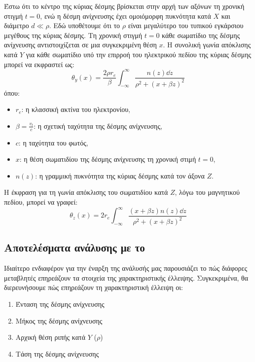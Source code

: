 Έστω ότι το κέντρο της κύριας δέσμης βρίσκεται στην αρχή των αξόνων τη χρονική στιγμή $t = 0$, ενώ η δέσμη ανίχνευσης έχει ομοιόμορφη πυκνότητα κατά $X$ και διάμετρο $d \ll \rho$.
Εδώ υποθέτουμε ότι το $\rho$ είναι μεγαλύτερο του τυπικού εγκάρσιου μεγέθους της κύριας δέσμης.
Τη χρονική στιγμή $t = 0$ κάθε  σωματίδιο της δέσμης ανίχνευσης αντιστοιχίζεται σε μια συγκεκριμένη θέση $x$.
Η συνολική γωνία απόκλισης κατά $Y$ για κάθε σωματίδιο υπό την επιρροή του ηλεκτρικού πεδίου της κύριας δέσμης μπορεί να εκφραστεί ως\cite{Logatchov1999}:
\begin{equation}
\theta_y (x) = \frac{2 \rho r_e}{\beta} \int_{-\infty}^{\infty}\frac{n(z) \dd z}{\rho^2 + \left(x+\beta z \right) ^2}
\end{equation}
όπου:
\begin{itemize}
\item $r_e$: η κλασσική ακτίνα του ηλεκτρονίου,
\item $\beta =\frac{v_t}{c}$: η σχετική ταχύτητα της δέσμης ανίχνευσης,
\item $c$: η ταχύτητα του φωτός,
\item $x$: η θέση σωματιδίου της δέσμης ανίχνευσης τη χρονική στιμή $t=0$,
\item $n(z)$: η γραμμική πυκνότητα της κύριας δέσμης κατά τον άξονα $Z$.
\end{itemize} 

Η έκφραση για τη γωνία απόκλισης του σωματιδίου κατά $Z$, λόγω του μαγνητικού πεδίου, μπορεί να γραφεί\cite{Logatchov1999}:
\begin{equation}
\theta_z(x) = 2 r_e \int_{-\infty}^{\infty}\frac{(x+\beta z)n(z) \dd z}{\rho^2 + \left(x+\beta z \right) ^2}
\end{equation}
\subsection{Αποτελέσματα ανάλυσης με το }
Ιδιαίτερο ενδιαφέρον για την έναρξη της ανάλυσής μας παρουσιάζει το πώς διάφορες μεταβλητές επηρεάζουν τα στοιχεία της χαρακτηριστικής έλλειψης. 
Συγκεκριμένα, θα διερευνήσουμε πώς επηρεάζουν τη χαρακτηριστική έλλειψη οι:
\begin{enumerate}
	\item Ένταση της δέσμης ανίχνευσης
	\item Μήκος της δέσμης ανίχνευσης
	\item Αρχική θέση ριπής κατά $Y$ ($\rho$) 
	\item Τάση της δέσμης ανίχνευσης
\end{enumerate}


